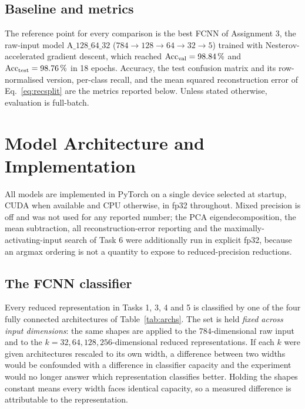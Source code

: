 \documentclass[11pt,a4paper]{article}
\begin{document}
\subsection{Baseline and metrics}\label{sec:dataset:baseline}
The reference point for every comparison is the best FCNN of Assignment 3, the raw-input
model $\mathrm{A\_128\_64\_32}$ ($784\rightarrow128\rightarrow64\rightarrow32\rightarrow5$)
trained with Nesterov-accelerated gradient descent, which reached $\mathrm{Acc}_{\mathrm{val}}=98.84\,\%$
and $\mathrm{Acc}_{\mathrm{test}}=98.76\,\%$ in 18 epochs.  Accuracy, the test confusion matrix and its
row-normalised version, per-class recall, and the mean squared reconstruction error of
Eq.~\eqref{eq:recsplit} are the metrics reported below.  Unless stated otherwise, evaluation is
full-batch.

\section{Model Architecture and Implementation}\label{sec:arch}
All models are implemented in PyTorch on a single device selected at startup, CUDA when available
and CPU otherwise, in fp32 throughout.  Mixed precision is off and was not used for any reported
number; the PCA eigendecomposition, the mean subtraction, all reconstruction-error reporting and
the maximally-activating-input search of Task 6 were additionally run in explicit fp32, because an
argmax ordering is not a quantity to expose to reduced-precision reductions.

\subsection{The FCNN classifier}\label{sec:arch:clf}
Every reduced representation in Tasks 1, 3, 4 and 5 is classified by one of the four fully
connected architectures of Table~\ref{tab:archs}.  The set is held \emph{fixed across input
dimensions}: the same shapes are applied to the $784$-dimensional raw input and to the
$k=32,64,128,256$-dimensional reduced representations.  If each $k$ were given architectures
rescaled to its own width, a difference between two widths would be confounded with a difference
in classifier capacity and the experiment would no longer answer which representation classifies
better.  Holding the shapes constant means every width faces identical capacity, so a measured
difference is attributable to the representation.
\end{document}

